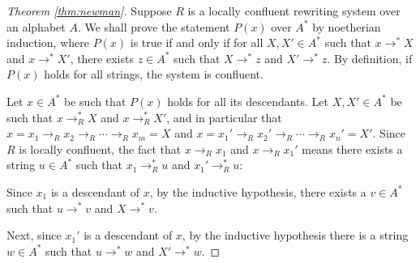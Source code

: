\documentclass[libertine,widepage,nosubthm]{lmaths}
\begin{document}
\begin{proof}[Theorem \ref{thm:newman}]
	Suppose $R$ is a locally confluent rewriting system over an alphabet $A$. We shall prove the statement $P(x)$ over $A^*$ by noetherian induction, where $P(x)$ is true if and only if for all $X, X' \in A^*$ such that $x \to^* X$ and $x \to^* X'$, there exists $z \in A^*$ such that $X \to^* z$ and $X' \to^* z$. By definition, if $P(x)$ holds for all strings, the system is confluent.

	Let $x \in A^*$ be such that $P(x)$ holds for all its descendants. Let $X, X' \in A^*$ be such that $x \to_R^* X$ and $x \to_R^* X'$, and in particular that $x = x_1 \to_R x_2 \to_R \cdots \to_R x_m = X$ and $x = x_1' \to_R x_2' \to_R \cdots \to_R x_n' = X'$. Since $R$ is locally confluent, the fact that $x \to_R x_1$ and $x \to_R x_1'$ means there exists a string $u \in A^*$ such that $x_1 \to_R^* u$ and $x_1' \to_R^* u$:

	{\centering
	\par}

	Since $x_1$ is a descendant of $x$, by the inductive hypothesis, there exists a $v \in A^*$ such that $u \to^* v$ and $X \to^* v$.

	{\centering
	\par}

	Next, since $x_1'$ is a descendant of $x$, by the inductive hypothesis there is a string $w \in A^*$ such that $u \to^* w$ and $X' \to^* w$.

	{\centering
	\par}


\end{proof}
\end{document}
